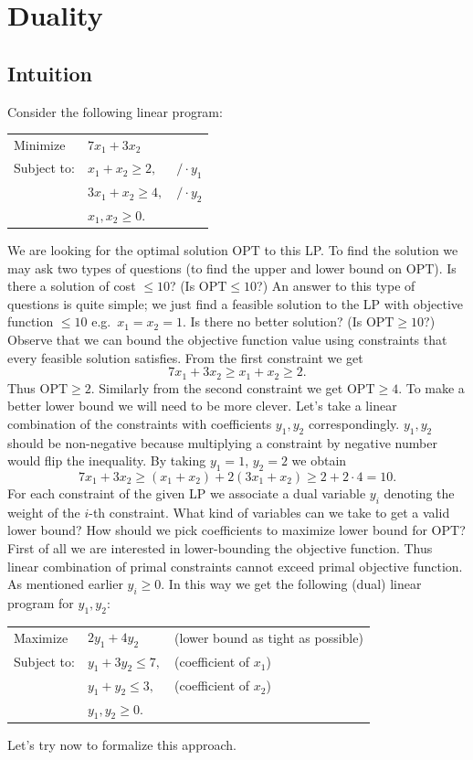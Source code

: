% 
\section{Duality}
\subsection{Intuition}

Consider the following linear program:
\begin{center}
\begin{tabular}{lll}
  Minimize    & $7x_1+3x_2$ & \\
  Subject to: & $x_1+x_2\ge 2,$  & $/\cdot y_1$\\
              & $3x_1+x_2\ge 4,$ & $/\cdot y_2$\\
              & $x_1,x_2\ge 0.$  &
\end{tabular}
\end{center}

We are looking for the optimal solution $\mathrm{OPT}$ to this LP. To find the solution we may ask
two types of questions (to find the upper and lower bound on $\mathrm{OPT}$). Is there a solution
of cost $\le 10$? (Is $\mathrm{OPT}\le 10$?) An answer to this type of questions is quite simple;
we just find a feasible solution to the LP with objective function $\le 10$ e.g.\ $x_1=x_2=1$. Is
there no better solution? (Is $\mathrm{OPT}\ge 10$?) Observe that we can bound the objective
function value using constraints that every feasible solution satisfies. From the first constraint
we get
\[
  7x_1+3x_2\ge x_1+x_2\ge 2.
\]
Thus $\mathrm{OPT}\ge 2$. Similarly from the second constraint we get $\mathrm{OPT}\ge 4$. To make
a better lower bound we will need to be more clever. Let's take a linear combination of the
constraints with coefficients $y_1,y_2$ correspondingly. $y_1,y_2$ should be non-negative because
multiplying a constraint by negative number would flip the inequality. By taking $y_1=1$, $y_2=2$
we obtain
\[
  7x_1+3x_2\ge(x_1+x_2)+2(3x_1+x_2)\ge 2+2\cdot 4=10.
\]
For each constraint of the given LP we associate a dual variable $y_i$ denoting the weight of the
$i$-th constraint. What kind of variables can we take to get a valid lower bound? How should we
pick coefficients to maximize lower bound for $\mathrm{OPT}$? First of all we are interested in
lower-bounding the objective function. Thus linear combination of primal constraints cannot
exceed primal objective function. As mentioned earlier $y_i\ge 0$. In this way we get the
following (dual) linear program for $y_1,y_2$:
\begin{center}
\begin{tabular}{lll}
  Maximize    & $2y_1+4y_2$ & (lower bound as tight as possible)\\
  Subject to: & $y_1+3y_2\le 7,$ & (coefficient of $x_1$)\\
              & $y_1+y_2\le 3,$  & (coefficient of $x_2$)\\
              & $y_1,y_2\ge 0.$  &
\end{tabular}
\end{center}
Let's try now to formalize this approach.

